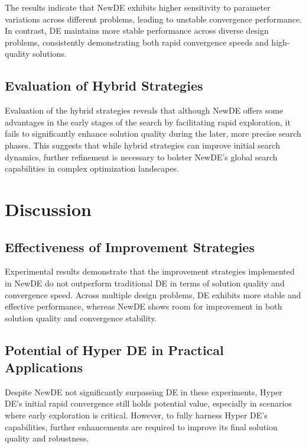 \documentclass[conference]{IEEEtran}
\begin{document}
The results indicate that NewDE exhibits higher sensitivity to parameter variations across different problems, leading to unstable convergence performance. In contrast, DE maintains more stable performance across diverse design problems, consistently demonstrating both rapid convergence speeds and high-quality solutions.

\subsection{Evaluation of Hybrid Strategies}

Evaluation of the hybrid strategies reveals that although NewDE offers some advantages in the early stages of the search by facilitating rapid exploration, it fails to significantly enhance solution quality during the later, more precise search phases. This suggests that while hybrid strategies can improve initial search dynamics, further refinement is necessary to bolster NewDE's global search capabilities in complex optimization landscapes.

\section{Discussion}

\subsection{Effectiveness of Improvement Strategies}

Experimental results demonstrate that the improvement strategies implemented in NewDE do not outperform traditional DE in terms of solution quality and convergence speed. Across multiple design problems, DE exhibits more stable and effective performance, whereas NewDE shows room for improvement in both solution quality and convergence stability.

\subsection{Potential of Hyper DE in Practical Applications}

Despite NewDE not significantly surpassing DE in these experiments, Hyper DE's initial rapid convergence still holds potential value, especially in scenarios where early exploration is critical. However, to fully harness Hyper DE's capabilities, further enhancements are required to improve its final solution quality and robustness.
\end{document}
